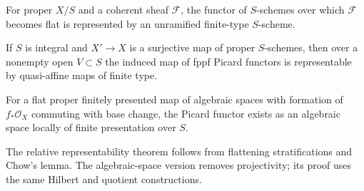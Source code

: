 \begin{theorem}\label{kps-thm-flattening}
For proper $X/S$ and a coherent sheaf $\mathcal F$, the functor of $S$-schemes
over which $\mathcal F$ becomes flat is represented by an unramified finite-type
$S$-scheme.
\notready
\end{theorem}

\begin{theorem}\label{kps-thm-relative-map}
If $S$ is integral and $X'\to X$ is a surjective map of proper $S$-schemes,
then over a nonempty open $V\subset S$ the induced map of fppf Picard functors
is representable by quasi-affine maps of finite type.
\notready
\end{theorem}

\begin{theorem}\label{kps-thm-algebraic-space}
For a flat proper finitely presented map of algebraic spaces with formation of
$f_*\mathcal O_X$ commuting with base change, the Picard functor exists as an
algebraic space locally of finite presentation over $S$.
\notready
\end{theorem}

\begin{remark}\label{kps-rmk-existence}
The relative representability theorem follows from flattening stratifications
and Chow's lemma. The algebraic-space version removes projectivity; its proof
uses the same Hilbert and quotient constructions.
\end{remark}
